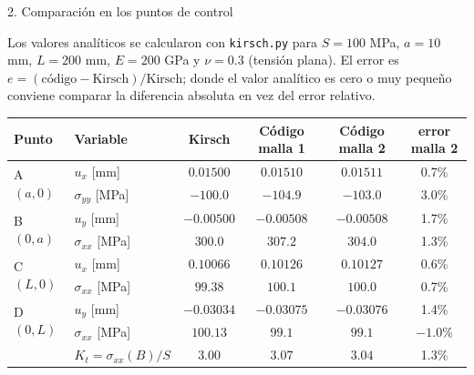 \begin{desarrollo}{2. Comparaci\'on en los puntos de control}

Los valores anal\'iticos se calcularon con \texttt{kirsch.py} para
$S=100$ MPa, $a=10$ mm, $L=200$ mm, $E=200$ GPa y $\nu=0.3$ (tensi\'on plana).
El error es $e=(\text{c\'odigo}-\text{Kirsch})/\text{Kirsch}$; donde el valor anal\'itico
es cero o muy peque\~no conviene comparar la diferencia absoluta en vez del
error relativo.

\begin{center}
\renewcommand{\arraystretch}{1.25}
\begin{tabular}{@{}llcccc@{}}
\toprule
Punto & Variable & Kirsch & C\'odigo malla 1 & C\'odigo malla 2 & error malla 2\\
\midrule
\multirow{2}{*}{A $(a,0)$}
  & $u_x$ [mm] & $0.01500$ & $0.01510$ & $0.01511$ & 0.7\%\\
  & $\sigma_{yy}$ [MPa] & $-100.0$ & $-104.9$ & $-103.0$ & 3.0\%\\
\midrule
\multirow{2}{*}{B $(0,a)$}
  & $u_y$ [mm] & $-0.00500$ & $-0.00508$ & $-0.00508$ & 1.7\%\\
  & $\sigma_{xx}$ [MPa] & $300.0$ & $307.2$ & $304.0$ & 1.3\%\\
\midrule
\multirow{2}{*}{C $(L,0)$}
  & $u_x$ [mm] & $0.10066$ & $0.10126$ & $0.10127$ & 0.6\%\\
  & $\sigma_{xx}$ [MPa] & $99.38$ & $100.1$ & $100.0$ & 0.7\%\\
\midrule
\multirow{2}{*}{D $(0,L)$}
  & $u_y$ [mm] & $-0.03034$ & $-0.03075$ & $-0.03076$ & 1.4\%\\
  & $\sigma_{xx}$ [MPa] & $100.13$ & $99.1$ & $99.1$ & $-1.0$\%\\
\midrule
& $K_t=\sigma_{xx}(B)/S$ & $3.00$ & $3.07$ & $3.04$ & 1.3\%\\
\bottomrule
\end{tabular}
\end{center}

\begin{center}

\vspace{6pt}
\end{center}


\end{desarrollo}
